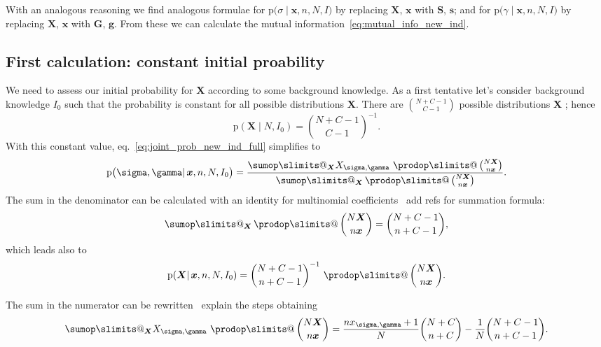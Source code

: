 \documentclass[\ifafour a4paper,12pt,\else a5paper,10pt,\fi%
onecolumn,oneside,article,%
british%
]{memoir}
\makeatletter
\theoremstyle{remark}
\theoremstyle{innote}
\def\sum{\DOTSI\sumop\slimits@}
\def\prod{\DOTSI\prodop\slimits@}
\newcommand*{\citep}{\parencites}
\newcommand*{\pf}{\mathrm{p}}%
\renewcommand*{\|}{\mathpunct{|}}
\newcommand*{\sect}{\S}%
\newcommand*{\eqn}{eq.}%
\newcommand*{\tprod}{\mathop{\textstyle\prod}\nolimits}
\newcommand*{\puzzle}{\maltese}
\newcommand{\mynote}[1]{ {\color{notecolour}\puzzle\ #1}}
\newcommand*{\yI}{I}
\newcommand*{\yprod}{\tprod}
\newcommand*{\ys}{\sigma}
\newcommand*{\yg}{\gamma}
\newcommand*{\yso}{\ys}
\newcommand*{\ygo}{\yg}
\newcommand*{\yFs}{\bm{S}}
\newcommand*{\yfs}{\bm{s}}
\newcommand*{\yFg}{\bm{G}}
\newcommand*{\yfg}{\bm{g}}
\newcommand*{\yF}{\bm{X}}
\newcommand*{\yf}{\bm{x}}
\newcommand*{\yIc}{I_{0}}
\makeatother
\begin{document}
With an analogous reasoning we find analogous formulae for
$\pf\bigl(\yso \| \yf, n,N, \yI\bigr)$ by replacing $\yF$, $\yf$ with
$\yFs$, $\yfs$; and for $\pf\bigl(\ygo \| \yf, n,N, \yI\bigr)$ by
replacing $\yF$, $\yf$ with $\yFg$, $\yfg$. From these we can calculate the
mutual information~\eqref{eq:mutual_info_new_ind}.


\subsection{First calculation: constant initial proability}
\label{sec:first_calc_const_prior}

We need to assess our initial probability for $\yF$ according to some
background knowledge. As a first tentative let's consider background
knowledge $\yIc$ such that the probability is constant for all possible
distributions $\yF$. There are $\binom{N+C-1}{C-1}$ possible distributions
$\yF$ \citep[\sect~2.1]{csiszaretal2004b}; hence
\begin{equation}
  \label{eq:constant_prior}
  \pf(\yF \| N,\yIc) = \binom{N+C-1}{C-1}^{-1}.
\end{equation}
With this constant value, \eqn~\eqref{eq:joint_prob_new_ind_full}
simplifies to
\begin{equation}
    \label{eq:joint_prob_new_ind_full_simplified}
  \pf\bigl(\yso, \ygo \| \yf, n,N, \yIc\bigr)  =
  \frac{
    \sum_{\yF} X_{\yso, \ygo}\,
    \yprod\binom{N\yF}{n\yf}}{
  \sum_{\yF} \yprod\binom{N\yF}{n\yf}}.
\end{equation}
The sum in the denominator can be calculated with an identity for
multinomial coefficients\mynote{add
  refs for summation formula}:
\begin{equation}
  \label{eq:multinomial_sum_identity}
  \sum_{\yF} \yprod\binom{N\yF}{n\yf} = \binom{N+C-1}{n+C-1},
\end{equation}
which leads also to
\begin{equation}
  \label{eq:F_from_f_specific}
  \pf(\yF \| \yf, n, N,\yIc) = \binom{N+C-1}{n+C-1}^{-1}\,\yprod\binom{N\yF}{n\yf}.
\end{equation}

The sum in the numerator can be rewritten\mynote{explain the steps} obtaining
\begin{equation}
  \label{eq:numerator_constant_prior}
  \sum_{\yF} X_{\yso, \ygo}\, \yprod\binom{N\yF}{n\yf}
  =
  \frac{n x_{\yso, \ygo}+1}{N} \binom{N+C}{n+C}
  - \frac{1}{N}\binom{N+C-1}{n+C-1}.
\end{equation}
\end{document}
